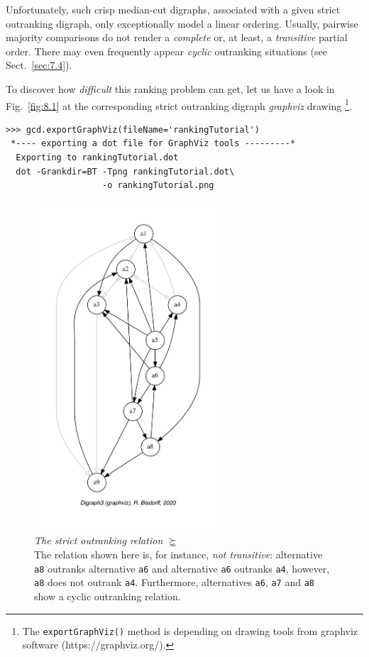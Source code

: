 Unfortunately, such crisp median-cut \Condorcet digraphs, associated with a given strict outranking digraph, only exceptionally model a linear ordering. Usually, pairwise majority comparisons do not render a \emph{complete} or, at least, a \emph{transitive} partial order. There may even frequently appear \emph{cyclic} outranking situations (see Sect.~\ref{sec:7.4}).

To discover how \emph{difficult} this ranking problem can get, let us have a look in Fig.~\vref{fig:8.1} at the corresponding strict outranking digraph \emph{graphviz} drawing \footnote{ The \texttt{exportGraphViz()} method is depending on drawing tools from graphviz software (https://graphviz.org/).}.
\begin{lstlisting}
>>> gcd.exportGraphViz(fileName='rankingTutorial')
 *---- exporting a dot file for GraphViz tools ---------*
  Exporting to rankingTutorial.dot
  dot -Grankdir=BT -Tpng rankingTutorial.dot\
                   -o rankingTutorial.png
\end{lstlisting}
\begin{figure}[ht]
\sidecaption[t]
\includegraphics[width=7cm]{Figures/8-1-rankingTutorial.pdf}
\caption[The strict outranking relation $\succnsim$]{\emph{The strict outranking relation} $\succnsim$\\ The relation shown here is, for instance, \emph{not transitive}: alternative \texttt{a8} outranks alternative \texttt{a6} and alternative \texttt{a6} outranks \texttt{a4}, however, \texttt{a8} does not outrank \texttt{a4}. Furthermore, alternatives \texttt{a6}, \texttt{a7} and \texttt{a8} show a cyclic outranking relation.}
\label{fig:8.1}       %
\end{figure}

